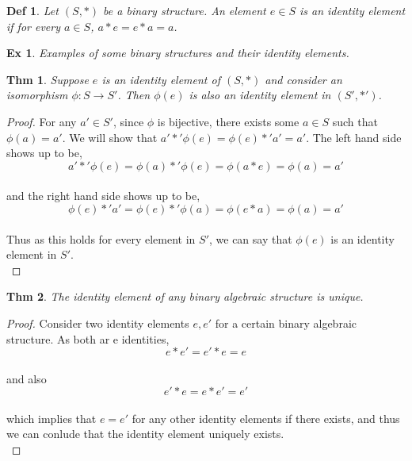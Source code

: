 \documentclass[paper=a4, fontsize=11pt]{scrartcl}
\newtheorem{theorem}{Thm}
\newtheorem{definition}{Def}
\newtheorem{example}{Ex}
\begin{document}
\begin{definition}
	Let $(S,\ast)$ be a binary structure. An element $e \in S$ is an identity element if for every $a \in S$, $a \ast e = e \ast a = a$.\\
\end{definition}

\begin{example}
	Examples of some binary structures and their identity elements.\\
\end{example}

\begin{theorem}
	Suppose $e$ is an identity element of $(S,\ast)$ and consider an isomorphism $\phi:S\to S'$. Then $\phi(e)$ is also an identity element in $(S',\ast')$.\\
\end{theorem}

\begin{proof}
	For any $a' \in S'$, since $\phi$ is bijective, there exists some $a \in S$ such that $\phi(a)=a'$. We will show that $a' \ast' \phi(e) =  \phi(e) \ast' a' = a'$. The left hand side shows up to be, \\
	\begin{equation}\nonumber
		a' \ast' \phi(e) = \phi(a) \ast' \phi(e)= \phi(a \ast e) = \phi(a) = a'
	\end{equation}\\
	and the right hand side shows up to be, \\
	\begin{equation}\nonumber
		 \phi(e) \ast' a' =  \phi(e) \ast' \phi(a) = \phi(e \ast a) = \phi(a) = a'
	\end{equation}\\
	Thus as this holds for every element in $S'$, we can say that $\phi(e)$ is an identity element in $S'$.\\
\end{proof}

\begin{theorem}
	The identity element of any binary algebraic structure is unique.\\
\end{theorem}

\begin{proof}
	Consider two identity elements $e,e'$ for a certain binary algebraic structure. As both ar e identities, \\
	\begin{equation} \nonumber
		e \ast e' = e' \ast e = e
	\end{equation}\\
	and also 
	\begin{equation} \nonumber
		e' \ast e = e \ast e' = e'
	\end{equation} \\
	which implies that $e=e'$ for any other identity elements if there exists, and thus we can conlude that the identity element uniquely exists.\\
\end{proof}
\end{document}
